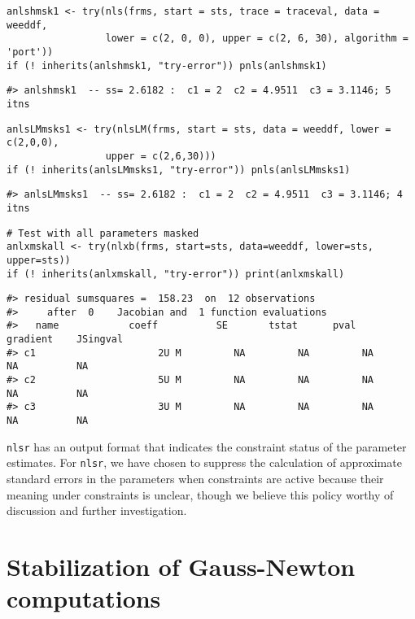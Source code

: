 \begin{verbatim}
anlshmsk1 <- try(nls(frms, start = sts, trace = traceval, data = weeddf, 
                 lower = c(2, 0, 0), upper = c(2, 6, 30), algorithm = 'port'))
if (! inherits(anlshmsk1, "try-error")) pnls(anlshmsk1)
\end{verbatim}

\begin{verbatim}
#> anlshmsk1  -- ss= 2.6182 :  c1 = 2  c2 = 4.9511  c3 = 3.1146; 5  itns
\end{verbatim}

\begin{verbatim}
anlsLMmsks1 <- try(nlsLM(frms, start = sts, data = weeddf, lower = c(2,0,0),
                 upper = c(2,6,30)))
if (! inherits(anlsLMmsks1, "try-error")) pnls(anlsLMmsks1)
\end{verbatim}

\begin{verbatim}
#> anlsLMmsks1  -- ss= 2.6182 :  c1 = 2  c2 = 4.9511  c3 = 3.1146; 4  itns
\end{verbatim}

\begin{verbatim}
# Test with all parameters masked
anlxmskall <- try(nlxb(frms, start=sts, data=weeddf, lower=sts, upper=sts))
if (! inherits(anlxmskall, "try-error")) print(anlxmskall)
\end{verbatim}

\begin{verbatim}
#> residual sumsquares =  158.23  on  12 observations
#>     after  0    Jacobian and  1 function evaluations
#>   name            coeff          SE       tstat      pval      gradient    JSingval   
#> c1                     2U M         NA         NA         NA          NA          NA  
#> c2                     5U M         NA         NA         NA          NA          NA  
#> c3                     3U M         NA         NA         NA          NA          NA
\end{verbatim}

\texttt{nlsr} has an output format that indicates the constraint status of the parameter
estimates. For \texttt{nlsr}, we have chosen to suppress the calculation of
approximate standard errors in the parameters when constraints are active because
their meaning under constraints is unclear, though we believe this
policy worthy of discussion and further investigation.

\hypertarget{stabilization-of-gauss-newton-computations}{%
\section{Stabilization of Gauss-Newton computations}\label{stabilization-of-gauss-newton-computations}}

